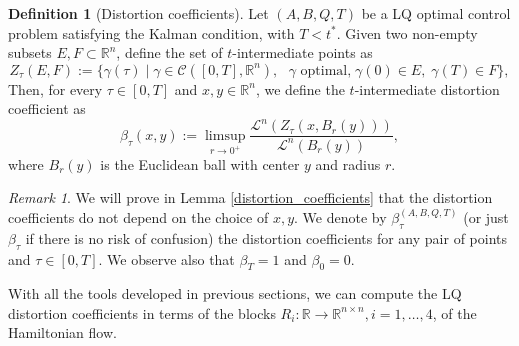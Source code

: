 \documentclass[reqno]{amsart}
\theoremstyle{plain}
\theoremstyle{definition}
\newtheorem{Def}[thm]{Definition}
\theoremstyle{remark}
\newtheorem{rem}[thm]{Remark}
\newcommand{\R}{\mathbb{R}}
\begin{document}
		\begin{Def}[Distortion coefficients]\label{def:distcoeff}
			Let $(A,B,Q,T)$ be a LQ optimal control problem satisfying the Kalman condition, with $T<t^*$. Given two non-empty subsets $E,F\subset \mathbb{R}^n$, define the set of $t$-intermediate points as
			\begin{equation}
				Z_\tau(E,F):=\{\gamma(\tau)\mid \gamma\in\mathcal{C}([0,T],\R^n), \text{ $\gamma$ optimal,}\; \gamma(0)\in E,\;\gamma(T)\in F\},
			\end{equation}
			 Then, for every $\tau\in[0,T]$ and $x,y\in\mathbb{R}^{n}$, we define the $t$-intermediate distortion coefficient as
			\begin{equation}
				\beta_\tau(x,y):=\limsup\limits_{r \to 0^{+}}\frac{\mathscr{L}^n(Z_\tau(x,B_r(y)))}{\mathscr{L}^n(B_r(y))},
			\end{equation}
                     where $B_r(y)$ is the Euclidean ball with center $y$ and radius $r$.
		\end{Def}
        \begin{rem}
        We will prove in Lemma \ref{distortion_coefficients} that the distortion coefficients do not depend on the choice of $x,y$. We denote by $\beta^{(A,B,Q,T)}_{\tau}$ (or just $\beta_{\tau}$ if there is no risk of confusion) the distortion coefficients for any pair of points and $\tau\in[0,T]$. We observe also that $\beta_T=1$ and $\beta_0=0$.
        \end{rem}

		With all the tools developed in previous sections, we can compute the LQ distortion coefficients in terms of 
       the blocks $R_i:\mathbb{R}\to\mathbb{R}^{n\times n}, i=1,\dots,4$, of the Hamiltonian flow.
        
\end{document}
